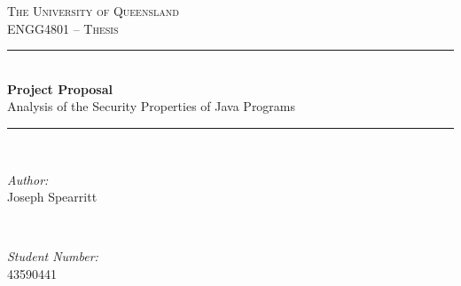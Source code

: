 
\begin{titlepage}

\newcommand{\HRule}{\rule{\linewidth}{0.5mm}} %

\centering %
 

\textsc{\LARGE The University of Queensland}\\[1cm] %
\textsc{\Large ENGG4801 -- Thesis}\\[0.5cm] %


\HRule \\[0.4cm]
{ \huge \bfseries Project Proposal}\\[0.2cm]
{\huge Analysis of the Security Properties of Java Programs}
\HRule \\[.5cm]
 

\begin{minipage}{0.45\textwidth}
\begin{flushleft} \large
\emph{Author:}\\
Joseph Spearritt
\end{flushleft}
\end{minipage}
~
\begin{minipage}{0.45\textwidth}
\begin{flushright} \large
\emph{Student Number:}\\
43590441
\end{flushright}
\end{minipage}\\[1.5cm]



\end{titlepage}
